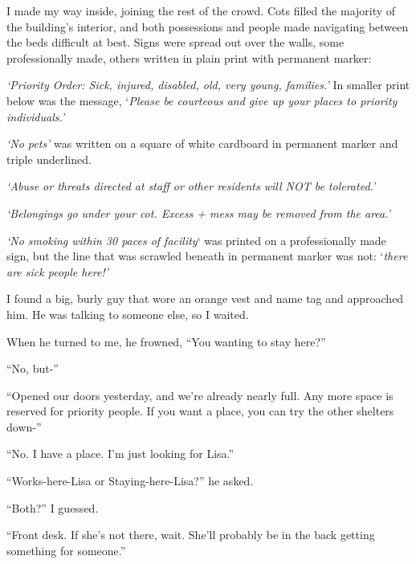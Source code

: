 I made my way inside, joining the rest of the crowd.  Cots filled the majority of the building's interior, and both possessions and people made navigating between the beds difficult at best.  Signs were spread out over the walls, some professionally made, others written in plain print with permanent marker:



\emph{`Priority Order: Sick, injured, disabled, old, very young, families.' } In smaller print below was the message, `\emph{Please be courteous and give up your places to priority individuals.'}



\emph{`No pets'} was written on a square of white cardboard in permanent marker and triple underlined.



\emph{ `Abuse or threats directed at staff or other residents will NOT be tolerated.'}



\emph{`Belongings go under your cot.  Excess + mess may be removed from the area.'}



\emph{`No smoking within 30 paces of facility}` was printed on a professionally made sign, but the line that was scrawled beneath in permanent marker was not: `\emph{there are sick people here!'}



I found a big, burly guy that wore an orange vest and name tag and approached him.  He was talking to someone else, so I waited.



When he turned to me, he frowned, ``You wanting to stay here?''



``No, but-''



``Opened our doors yesterday, and we're already nearly full.  Any more space is reserved for priority people.  If you want a place, you can try the other shelters down-''



``No.  I have a place.  I'm just looking for Lisa.''



``Works-here-Lisa or Staying-here-Lisa?'' he asked.



``Both?'' I guessed.



``Front desk.  If she's not there, wait.  She'll probably be in the back getting something for someone.''



